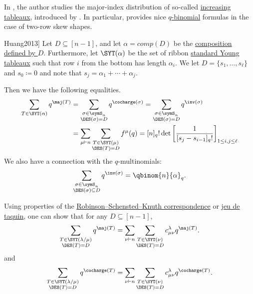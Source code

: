 In \cite{Chen2020}, the author studies the major-index distribution of
so-called \hyperref[cspIncreasingTableau]{increasing tableaux}, introduced by
 \cite{Pechenik2014}.  In particular, 
provides nice \hyperref[qBinomialCoefficient]{$q$-binomial} formulas in the
case of two-row skew shapes.



\begin{theorem}[See \cite[Cor. 4.9(ii)]{Huang2013}]
Let $D \subseteq [n-1]$, and let $\alpha = comp(D)$
be the \hyperref[gesselDefinitionSubsets]{composition defined by $D$}.
Furthermore, let $\SYT(\alpha)$ be the set of ribbon
\hyperref[standardYoungTableau]{standard Young tableaux}
such that row $i$ from the bottom has length $\alpha_i$.
We let $D = \{s_1,\dotsc,s_\ell\}$ and $s_0 \coloneqq 0$ and note that
$s_j = \alpha_1+ \dotsb + \alpha_j$.

Then we have the following equalities.
\begin{align}
 \sum_{T \in \SYT(\alpha)} q^{\maj(T)}
 &=
 \sum_{\substack{ \sigma \in \symS_n \\ \DES(\sigma) = D }} q^{\cocharge(\sigma)}
 =
 \sum_{\substack{ \sigma \in \symS_n \\ \DES(\sigma) = D }} q^{\inv(\sigma)}
 \\
 &=
 \sum_{\mu \vdash n} \sum_{\substack{ T \in \SYT(\mu) \\ \DES(T) = D}} f^\mu(q)
 =
 [n]_q! \det\left[ \frac{1}{ [s_j-s_{i-1}]_q! } \right]_{1 \leq i,j \leq \ell}
\end{align}
We also have a connection with the $q$-multinomials:
\[
\sum_{ \substack{ \sigma \in \symS_n \\ \DES(\sigma) \subseteq  D }} q^{\inv(\sigma)} = \qbinom{n}{\alpha}_q.
\]
\end{theorem}



Using properties of the \hyperref[rsk]{Robinson--Schensted--Knuth correspondence}
or \hyperref[jeuDeTaquin]{jeu de taquin}, one can show that for any
$D\subseteq [n-1]$,
\begin{equation*}
 \sum_{\substack{T \in \SYT(\lambda/\mu) \\ \DES(T) = D}} q^{\maj(T)}
 =
 \sum_{\nu \vdash n} \sum_{\substack{T \in \SYT(\nu)\\ \DES(T) = D}}
 c^{\lambda}_{\mu\nu} q^{\maj(T)}.
\end{equation*}
and
\begin{equation*}
 \sum_{\substack{T \in \SYT(\lambda/\mu) \\ \DES(T) = D}} q^{\cocharge(T)}
 =
 \sum_{\nu \vdash n} \sum_{\substack{T \in \SYT(\nu)\\ \DES(T) = D}}
 c^{\lambda}_{\mu\nu} q^{\cocharge(T)}.
\end{equation*}

